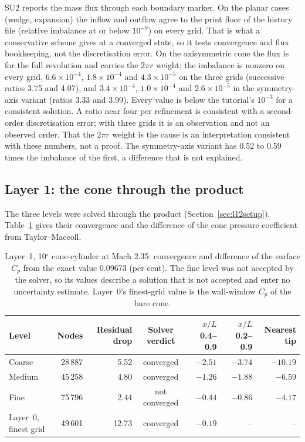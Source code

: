 \documentclass[11pt,a4paper]{article}
\newcommand{\Cp}{C_p}
\begin{document}
SU2 reports the mass flux through each boundary marker.
On the planar cases (wedge, expansion) the inflow and outflow agree to the print floor of the history file
(relative imbalance at or below $10^{-9}$) on every grid.
That is what a conservative scheme gives at a converged state, so it tests convergence and flux bookkeeping, not the
discretisation error.
On the axisymmetric cone the flux is for the full revolution and carries the $2\pi r$ weight; the imbalance is
nonzero on every grid, $6.6\times10^{-4}$, $1.8\times10^{-4}$ and $4.3\times10^{-5}$ on the three grids
(successive ratios 3.75 and 4.07), and $3.4\times10^{-4}$, $1.0\times10^{-4}$ and $2.6\times10^{-5}$ in the
symmetry-axis variant (ratios 3.33 and 3.99).
Every value is below the tutorial's $10^{-3}$ for a consistent solution.
A ratio near four per refinement is consistent with a second-order discretisation error; with three grids it is an
observation and not an observed order.
That the $2\pi r$ weight is the cause is an interpretation consistent with these numbers, not a proof.
The symmetry-axis variant has 0.52 to 0.59 times the imbalance of the first, a difference that is not explained.

\subsection{Layer 1: the cone through the product}
\label{sec:layer1}

The three levels were solved through the product (Section~\ref{sec:l12setup}).
Table~\ref{tab:layer1} gives their convergence and the difference of the cone pressure coefficient from Taylor--Maccoll.

\begin{table}[t]
\centering
\caption{Layer~1, 10$^\circ$ cone-cylinder at Mach 2.35: convergence and difference of the surface $\Cp$ from the exact value
0.09673 (per cent). The fine level was not accepted by the solver, so its values describe a solution that is not accepted
and enter no uncertainty estimate. Layer~0's finest-grid value is the wall-window $\Cp$ of the bare cone.}
\label{tab:layer1}
\small
\begin{tabular}{@{}lrrcrrr@{}}
\toprule
Level & Nodes & Residual drop & Solver verdict & $x/L$ 0.4--0.9 & $x/L$ 0.2--0.9 & Nearest tip \\
\midrule
Coarse & 28\,887 & 5.52 & converged & $-2.51$ & $-3.74$ & $-10.19$ \\
Medium & 45\,258 & 4.80 & converged & $-1.26$ & $-1.88$ & $-6.59$ \\
Fine & 75\,796 & 2.44 & not converged & $-0.44$ & $-0.86$ & $-4.17$ \\
\midrule
Layer~0, finest grid & 49\,601 & 12.73 & converged & $-0.19$ & -- & -- \\
\bottomrule
\end{tabular}
\end{table}
\end{document}

